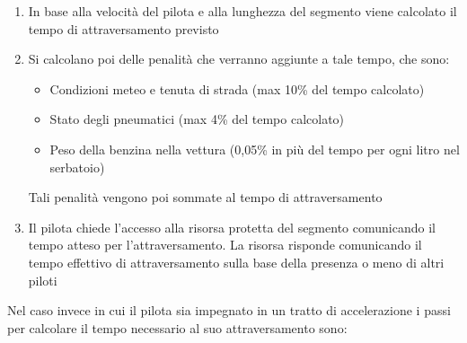 \documentclass[a4paper,11pt, twoside, openright]{book}
\begin{document}
	  \begin{enumerate}
	    \item In base alla velocità del pilota e alla lunghezza del segmento viene calcolato il tempo di attraversamento previsto
	    \item Si calcolano poi delle penalità che verranno aggiunte a tale tempo, che sono:
		  \begin{itemize}
		    \item Condizioni meteo e tenuta di strada (max 10\% del tempo calcolato)
		    \item Stato degli pneumatici (max 4\% del tempo calcolato)
		    \item Peso della benzina nella vettura (0,05\% in più del tempo per ogni litro nel serbatoio)
		  \end{itemize}
		  Tali penalità vengono poi sommate al tempo di attraversamento
	    \item Il pilota chiede l'accesso alla risorsa protetta del segmento
		  comunicando il tempo atteso per l'attraversamento. La risorsa risponde comunicando il tempo
		  effettivo di attraversamento sulla base della presenza o meno di altri piloti
	  \end{enumerate}
	  
	  Nel caso invece in cui il pilota sia impegnato in un tratto di accelerazione i passi
	  per calcolare il tempo necessario al suo attraversamento sono:
	  
\end{document}

